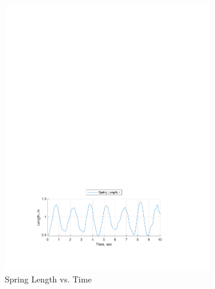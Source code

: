 \documentclass[12pt]{report}
\begin{document}
\begin{flushleft}
\begin{figure}[!ht]
\caption{Numerical Solution Motion Behavior Plot, ($\theta_o:~\sfrac{\pi}{6},~\phi_o:~\sfrac{\pi}{3}$)}
\begin{subfigure}[t]{\textwidth}
  \includegraphics[center]{spring_6-3}
  \caption{Spring Length vs. Time}
  \label{fig:spring:6-3}
\end{subfigure}
\begin{subfigure}[t]{\textwidth}

\end{subfigure}
\end{figure}
\end{flushleft}
\end{document}
